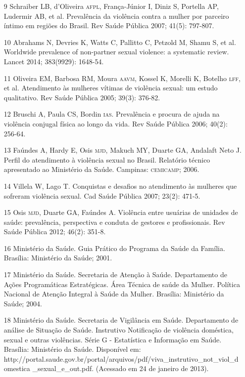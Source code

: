 \documentclass{article}
\begin{document}
\begin{itemize}
\item[9] Schraiber LB, d'Oliveira \textsc{afpl}, França-Júnior I, Diniz S, Portella
AP, Ludermir AB, et al. Prevalência da violência contra a mulher por parceiro
íntimo em regiões do Brasil. Rev Saúde Pública 2007; 41(5): 797-807.

\item[10] Abrahams N, Devries K, Watts C, Pallitto C, Petzold M, Shamu S, et
al. Worldwide prevalence of non-partner sexual violence: a systematic review.
Lancet 2014; 383(9929): 1648-54.

\item[11] Oliveira EM, Barbosa RM, Moura \textsc{aavm}, Kossel K, Morelli K, Botelho
\textsc{lff}, et al. Atendimento às mulheres vítimas de violência sexual: um estudo
qualitativo. Rev Saúde Pública 2005; 39(3): 376-82.

\item[12] Bruschi A, Paula CS, Bordin \textsc{ias}. Prevalência e procura de ajuda na
violência conjugal física ao longo da vida. Rev Saúde Pública 2006; 40(2):
256-64.

\item[13] Faúndes A, Hardy E, Osis \textsc{mjd}, Makuch MY, Duarte GA, Andalaft Neto
J. Perfil do atendimento à violência sexual no Brasil. Relatório técnico
apresentado ao Ministério da Saúde. Campinas: \textsc{cemicamp}; 2006.

\item[14] Villela W, Lago T. Conquistas e desafios no atendimento às
mulheres que sofreram violência sexual. Cad Saúde Pública 2007; 23(2): 471-5.

\item[15] Osis \textsc{mjd}, Duarte GA, Faúndes A. Violência entre usuárias de
unidades de saúde: prevalência, perspectiva e conduta de gestores e
profissionais. Rev Saúde Pública 2012; 46(2): 351-8.

\item[16] Ministério da Saúde. Guia Prático do Programa da Saúde da Família.
Brasília: Ministério da Saúde; 2001.

\item[17] Ministério da Saúde. Secretaria de Atenção à Saúde. Departamento
de Ações Programáticas Estratégicas. Área Técnica de saúde da Mulher. Política
Nacional de Atenção Integral à Saúde da Mulher. Brasília: Ministério da Saúde;
2004.

\item[18] Ministério da Saúde. Secretaria de Vigilância em Saúde.
Departamento de análise de Situação de Saúde. Instrutivo Notificação de
violência doméstica, sexual e outras violências. Série G - Estatística e
Informação em Saúde. Brasília: Ministério da Saúde. Disponível em: http://portal.saude.gov.br/portal/arquivos/pdf/viva\_{}instrutivo\_{}not\_{}viol\_{}domestica
\_{}sexual\_{}e\_{}out.pdf. (Acessado em 24 de janeiro de 2013).


\end{itemize}
\end{document}

